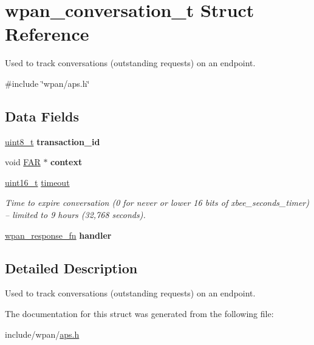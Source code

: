 \hypertarget{structwpan__conversation__t}{}\section{wpan\+\_\+conversation\+\_\+t Struct Reference}
\label{structwpan__conversation__t}


Used to track conversations (outstanding requests) on an endpoint.  




{\ttfamily \#include \char`\"{}wpan/aps.\+h\char`\"{}}

\subsection*{Data Fields}
\begin{DoxyCompactItemize}
\item 
\hyperlink{group__hal__dos_gae1affc9ca37cfb624959c866a73f83c2}{uint8\+\_\+t} {\bfseries transaction\+\_\+id}
\item 
void \hyperlink{group__hal_gaef060b3456fdcc093a7210a762d5f2ed}{F\+AR} $\ast$ {\bfseries context}
\item 
\hyperlink{group__hal__dos_ga5a8b2dc9e45a9ee81a94ef304fb62505}{uint16\+\_\+t} \hyperlink{group__wpan__aps_ga7f1ad43d3bf79b40bc39dbb5a6c3a5ae}{timeout}
\begin{DoxyCompactList}\small\item\em Time to expire conversation (0 for never or lower 16 bits of xbee\+\_\+seconds\+\_\+timer) -- limited to 9 hours (32,768 seconds). \end{DoxyCompactList}\item 
\hyperlink{group__wpan__aps_gabf0a6b85c9ff3ff9104c8b58c1436d72}{wpan\+\_\+response\+\_\+fn} {\bfseries handler}
\end{DoxyCompactItemize}


\subsection{Detailed Description}
Used to track conversations (outstanding requests) on an endpoint. 

The documentation for this struct was generated from the following file\+:\begin{DoxyCompactItemize}
\item 
include/wpan/\hyperlink{aps_8h}{aps.\+h}\end{DoxyCompactItemize}
